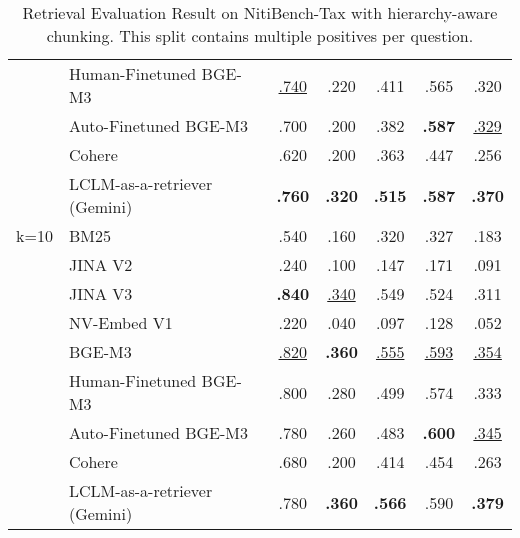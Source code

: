 \begin{table}[!ht]
\begin{tabular}{@{}clccccc@{}}
      & Human-Finetuned BGE-M3 & \underline{.740}    & .220          & .411          & .565          & .320          \\
      & Auto-Finetuned BGE-M3  & .700          & .200          & .382          & \textbf{.587} & \underline{.329}    \\
      & Cohere                 & .620          & .200          & .363          & .447          & .256          \\
      & LCLM-as-a-retriever (Gemini)                   & \textbf{.760} & \textbf{.320} & \textbf{.515} & \textbf{.587} & \textbf{.370} \\ \midrule
k=10  & BM25                   & .540          & .160          & .320          & .327          & .183          \\
      & JINA V2                & .240          & .100          & .147          & .171          & .091          \\
      & JINA V3                & \textbf{.840} & \underline{.340}    & .549          & .524          & .311          \\
      & NV-Embed V1            & .220          & .040          & .097          & .128          & .052          \\
      & BGE-M3                 & \underline{.820}    & \textbf{.360} & \underline{.555}    & \underline{.593}    & \underline{.354}    \\
      & Human-Finetuned BGE-M3 & .800          & .280          & .499          & .574          & .333          \\
      & Auto-Finetuned BGE-M3  & .780          & .260          & .483          & \textbf{.600} & \underline{.345}    \\
      & Cohere                 & .680          & .200          & .414          & .454          & .263          \\
      & LCLM-as-a-retriever (Gemini)                   & .780          & \textbf{.360} & \textbf{.566} & .590          & \textbf{.379} \\ \bottomrule
\end{tabular}
\caption{Retrieval Evaluation Result on NitiBench-Tax with hierarchy-aware chunking. This split contains multiple positives per question.}
\label{table: retrieval_tax_lclm}
\end{table}



